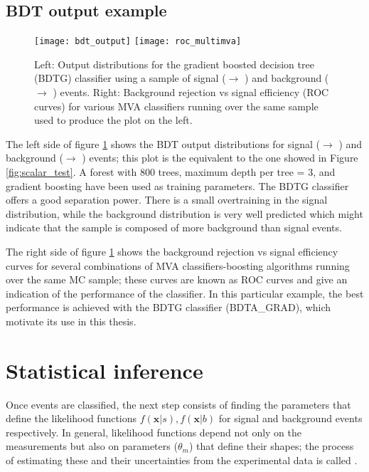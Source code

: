 \subsection{BDT output example}

\begin{figure}[!h]
  \centering
  \texttt{[image: bdt\_output]}
  \texttt{[image: roc\_multimva]}
  \caption[BDT output example.]{Left: Output distributions for the gradient boosted decision tree (BDTG) classifier using a sample of signal (\pp $\to$ \tHq) and background (\pp $\to$ \ttbar) events. Right: Background rejection vs signal efficiency (ROC curves) for various MVA classifiers running over the same sample used to produce the plot on the left.}\label{fig:bdt_output}
\end{figure}

The left side of figure \ref{fig:bdt_output} shows the BDT output distributions for signal (\pp $\to$ \tHq) and background (\pp $\to$ \ttbar) events; this plot is the equivalent to the one showed in Figure \ref{fig:scalar_test}. A forest with 800 trees, maximum depth per tree = 3, and gradient boosting have been used as training parameters. The BDTG classifier offers a good separation power. There is a small overtraining in the signal distribution, while the background distribution is very well predicted which might indicate that the sample is composed of more background than signal events.

The right side of figure \ref{fig:bdt_output} shows the background rejection vs signal efficiency curves for several combinations of MVA classifiers-boosting algorithms running over the same MC sample; these curves are known as ROC curves and give an indication of the performance of the classifier. In this particular example, the best performance is achieved with the BDTG classifier (BDTA\_GRAD), which motivate its use in this thesis.         

\section{Statistical inference}

Once events are classified, the next step consists of finding the parameters that define the likelihood functions $f(\textbf{x}|s), f(\textbf{x}|b)$ for signal and background events respectively. In general, likelihood functions depend not only on the measurements but also on parameters ($\theta_m$) that define their shapes; the process of estimating these  and their uncertainties from the experimental data is called .     

